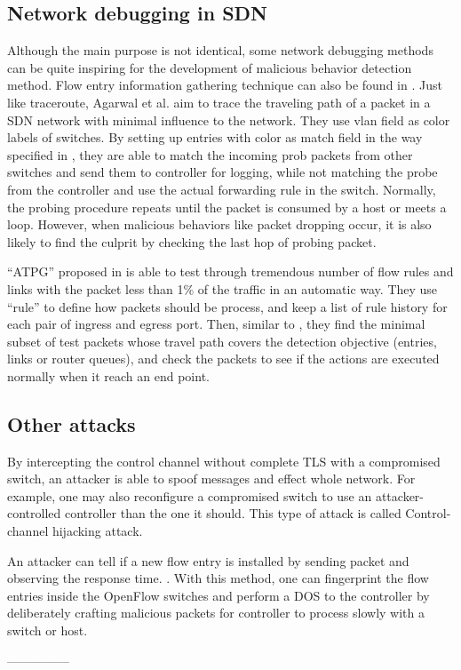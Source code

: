 \subsection{Network debugging in SDN}
Although the main purpose is not identical, some network debugging methods can be quite inspiring for the development of malicious behavior detection method. Flow entry information gathering technique can also be found in \cite{ARDC14}. Just like traceroute, Agarwal et al. aim to trace the traveling path of a packet in a SDN network with minimal influence to the network. They use vlan field as color labels of switches. By setting up entries with color as match field in the way specified in \cite{ARDC14}, they are able to match the incoming prob packets from other switches and send them to controller for logging, while not matching the probe from the controller and use the actual forwarding rule in the switch. Normally, the probing procedure repeats until the packet is consumed by a host or meets a loop. However, when malicious behaviors like packet dropping occur, it is also likely to find the culprit by checking the last hop of probing packet.

``ATPG'' proposed in \cite{ZKVM12} is able to test through tremendous number of flow rules and links with the packet less than 1\% of the traffic in an automatic way. They use ``rule'' to define how packets should be process, and keep a list of rule history for each pair of ingress and egress port. Then, similar to \cite{PJL16}, they find the minimal subset of test packets whose travel path covers the detection objective (entries, links or router queues), and check the packets to see if the actions are executed normally when it reach an end point. 

\subsection{Other attacks}
By intercepting the control channel without complete TLS with a compromised switch, an attacker is able to spoof messages and effect whole network. For example, one may also reconfigure a compromised switch to use an attacker-controlled controller than the one it should. This type of attack is called Control-channel hijacking attack.

An attacker can tell if a new flow entry is installed by sending packet and observing the response time. \cite{BCKK15}. With this method, one can fingerprint the flow entries inside the OpenFlow switches and perform a DOS to the controller by deliberately crafting malicious packets for controller to process slowly with a switch or host\cite{AAS14}.

---------------